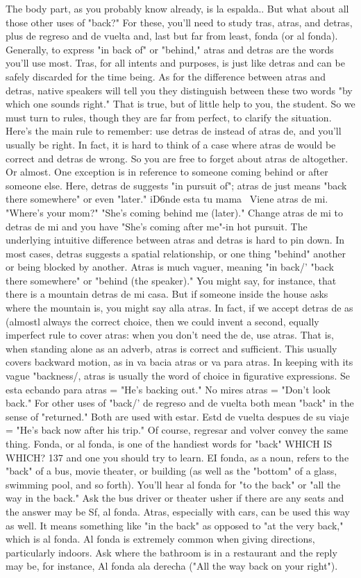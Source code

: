 The body part, as you probably know already, is la espalda..
But what about all those other uses of "back?" For these, you'll need
to study tras, atras, and detras, plus de regreso and de vuelta and, last
but far from least, fonda (or al fonda).
Generally, to express "in back of" or "behind," atras and detras are the words you'll use most. Tras, for all intents and purposes, is
just like detras and can be safely discarded for the time being. As for
the difference between atras and detras, native speakers will tell you
they distinguish between these two words "by which one sounds right."
That is true, but of little help to you, the student. So we must turn to
rules, though they are far from perfect, to clarify the situation.
Here's the main rule to remember: use detras de instead of
atras de, and you'll usually be right. In fact, it is hard to think of a case
where atras de would be correct and detras de wrong. So you are free
to forget about atras de altogether. Or almost. One exception is in reference to someone coming behind or after someone else. Here, detras
de suggests "in pursuit of"; atras de just means "back there somewhere" or even "later." iD6nde esta tu mama~ Viene atras de mi.
"Where's your mom?" "She's coming behind me (later)." Change atras
de mi to detras de mi and you have "She's coming after me"-in
hot pursuit.
The underlying intuitive difference between atras and detras
is hard to pin down. In most cases, detras suggests a spatial relationship, or one thing "behind" another or being blocked by another. Atras
is much vaguer, meaning "in back/' "back there somewhere" or "behind (the speaker)." You might say, for instance, that there is a mountain detras de mi casa. But if someone inside the house asks where the
mountain is, you might say alla atras.
In fact, if we accept detras de as (almostl always the correct
choice, then we could invent a second, equally imperfect rule to cover
atras: when you don't need the de, use atras. That is, when standing
alone as an adverb, atras is correct and sufficient. This usually covers
backward motion, as in va bacia atras or va para atras. In keeping
with its vague "backness/, atras is usually the word of choice in figurative expressions. Se esta ecbando para atras = "He's backing out."
No mires atras = "Don't look back."
For other uses of "back/' de regreso and de vuelta both mean
"back" in the sense of "returned." Both are used with estar. Estd de
vuelta despues de su viaje = "He's back now after his trip." Of course,
regresar and volver convey the same thing.
Fonda, or al fonda, is one of the handiest words for "back"
WHICH IS WHICH? 137
and one you should try to learn. EI fonda, as a noun, refers to the
"back" of a bus, movie theater, or building (as well as the "bottom"
of a glass, swimming pool, and so forth). You'll hear al fonda for "to
the back" or "all the way in the back." Ask the bus driver or theater
usher if there are any seats and the answer may be Sf, al fonda. Atras,
especially with cars, can be used this way as well. It means something
like "in the back" as opposed to "at the very back," which is al fonda.
Al fonda is extremely common when giving directions, particularly
indoors. Ask where the bathroom is in a restaurant and the reply may
be, for instance, Al fonda ala derecha ("All the way back on your
right").

